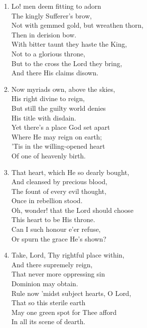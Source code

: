 \begin{enumerate}
    \item Lo! men deem fitting to adorn \\
        The kingly Sufferer's brow, \\
        Not with gemmed gold, but wreathen thorn, \\
        Then in derision bow. \\
        With bitter taunt they haste the King, \\
        Not to a glorious throne, \\
        But to the cross the Lord they bring, \\
        And there His claims disown.

    \item Now myriads own, above the skies, \\
        His right divine to reign, \\
        But still the guilty world denies \\
        His title with disdain. \\
        Yet there's a place God set apart \\
        Where He may reign on earth; \\
        'Tis in the willing-opened heart \\
        Of one of heavenly birth.

    \item That heart, which He so dearly bought, \\
        And cleansed by precious blood, \\
        The fount of every evil thought, \\
        Once in rebellion stood. \\
        Oh, wonder! that the Lord should choose \\
        This heart to be His throne. \\
        Can I such honour e'er refuse, \\
        Or spurn the grace He's shown?

    \item Take, Lord, Thy rightful place within, \\
        And there supremely reign, \\
        That never more oppressing sin \\
        Dominion may obtain. \\
        Rule now 'midst subject hearts, O Lord, \\
        That so this sterile earth \\
        May one green spot for Thee afford \\
        In all its scene of dearth.


\end{enumerate}
